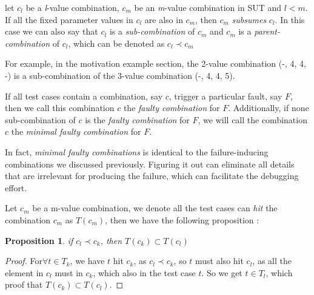 \documentclass{sig-alternate}
\begin{document}
\begin{definition}
let $c_{l}$ be a \emph{l}-value combination, $c_{m}$ be an \emph{m}-value combination in SUT and $l < m$. If all the fixed parameter values in $c_{l}$ are also in $c_{m}$, then $c_{m}$ \emph{subsumes} $c_{l}$. In this case we can also say that $c_{l}$ is a \emph{sub-combination} of $c_{m}$ and $c_{m}$ is a \emph{parent-combination} of $c_{l}$, which can be denoted as $c_{l} \prec  c_{m}$
\end{definition}

For example, in the motivation example section, the 2-value combination (-, 4, 4, -) is a sub-combination of the 3-value combination (-, 4, 4, 5).

\begin{definition}
If all test cases contain a combination, say $c$, trigger a particular fault, say $F$, then we call this combination $c$ the \emph{faulty combination} for $F$. Additionally, if none sub-combination of $c$ is the \emph{faulty combination} for $F$, we will call the combination $c$ the \emph{minimal faulty combination} for $F$.

\end{definition}

In fact, \emph{minimal faulty combinations} is identical to the failure-inducing combinations we discussed previously. Figuring it out can eliminate all details that are irrelevant for producing the failure, which can facilitate the debugging effort.


%

Let $c_{m}$ be a m-value combination, we denote all the test cases can \emph{hit} the combination $c_{m}$ as $T(c_{m})$,  then we have the following proposition :
\newtheorem{proposition}{Proposition}
\begin{proposition}
if $c_{l} \prec c_{k}$, then $T(c_{k}) \subset T(c_{l})$
\end{proposition}

\begin{proof}
For$ \forall t \in T_{k}$, we have $t$ hit $c_{k}$, as $c_{l} \prec c_{k}$, so $t$ must also hit $c_{l}$, as all the element in $c_{l}$ must in $c_{k}$, which also in the test case $t$. So we get $t \in T_{l}$, which proof that $T(c_{k}) \subset T(c_{l})$. 
\end{proof}
\end{document}
